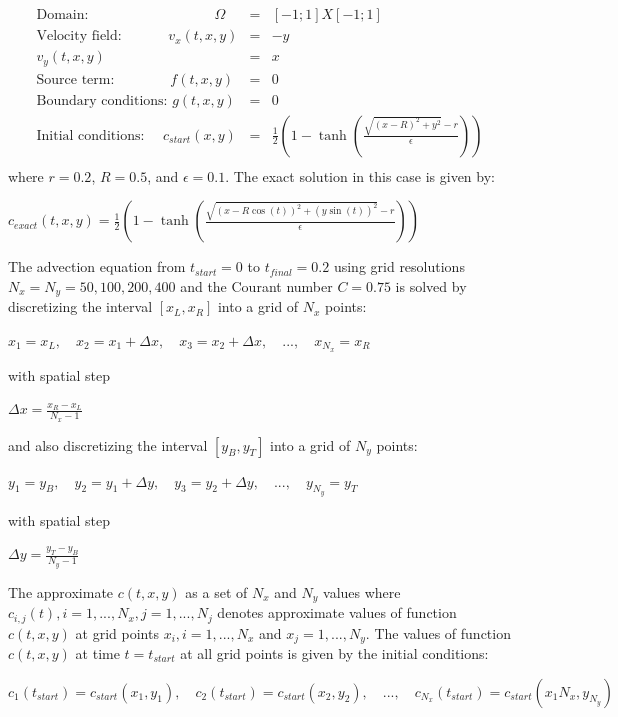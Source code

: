 \documentclass[12pt]{article}
\begin{document}
\begin{eqnarray}
\textrm{Domain:}\quad \quad \quad \quad \quad \quad \quad \quad \quad \Omega &=& [-1;1]X[-1;1]  \\\nonumber
\textrm{Velocity field: }\quad \quad \quad v_x(t,x,y) &=& -y\\\nonumber
			 v_y(t,x,y) &=& x\\\nonumber
\textrm{Source term:}\quad \quad \quad \quad f(t,x,y)&=&0 \\\nonumber
\textrm{Boundary conditions: } g(t,x,y)&=&0 \\\nonumber
\textrm{Initial conditions: }\quad c_{start}(x,y)&=&\frac{1}{2}\left(1-\tanh \left( \frac{\sqrt{(x-R)^2+y^2}-r}{\epsilon}\right)\right)\\\nonumber 
\end{eqnarray}
where $r=0.2$, $R=0.5$, and $\epsilon = 0.1$. The exact solution in this case is given by:
\begin{center}
$ c_{exact}(t,x,y)=\frac{1}{2}\left(1-\tanh \left( \frac{\sqrt{(x-R \cos(t))^2+(y\sin(t))^2}-r}{\epsilon}\right)\right)$
\end{center}
The advection equation from $t_{start}=0$ to $t_{final} = 0.2$ using grid resolutions $N_x = N_y = 50, 100, 200, 400$ and the Courant number $C=0.75$ is solved by discretizing the interval $[x_L, x_R]$ into a grid of $N_x$ points:
\begin{center}
$ x_1 = x_L, \quad x_2 = x_1 + \Delta x, \quad x_3 = x_2 + \Delta x, \quad ..., \quad x_{N_x}=x_R$
\end{center}
with spatial step
\begin{center}
$ \Delta x = \frac{x_R-x_L}{N_x-1}$
\end{center}
and also discretizing the interval $[y_B, y_T]$ into a grid of $N_y$ points:
\begin{center}
$ y_1 = y_B, \quad y_2 = y_1 + \Delta y, \quad y_3 = y_2 + \Delta y, \quad ..., \quad y_{N_y}=y_T$
\end{center}
with spatial step
\begin{center}
$ \Delta y = \frac{y_T-y_B}{N_y-1}$
\end{center}
The approximate $c(t,x,y)$ as a set of $N_x$ and $N_y$ values where $c_{i,j}(t), i = 1, ..., N_x , j =1,...,N_j$ denotes approximate values of function $c(t,x,y)$ at grid points $x_i, i =1,...,N_x$ and $x_j = 1,...,N_y$.  The values of function $c(t,x,y)$ at time $t =  t_{start}$ at all grid points is given by the initial conditions:
\begin{center}
$ c_1(t_{start}) = c_{start}(x_1,y_1), \quad c_2(t_{start}) = c_{start}(x_2,y_2), \quad ..., \quad c_{N_x}(t_{start}) = c_{start}(x_1{N_x},y_{N_y})$
\end{center}
\end{document}
